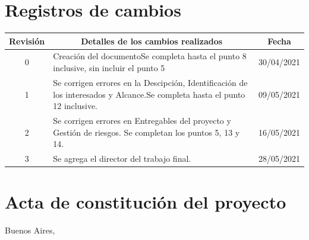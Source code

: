 \documentclass[
11pt, %
]{charter}
\begin{document}
\maketitle
\thispagestyle{empty}
\pagebreak


\thispagestyle{empty}
{\setlength{\parskip}{0pt}
\tableofcontents{}
}
\pagebreak


\section{Registros de cambios}
\label{sec:registro}


\begin{table}[ht]
\label{tab:registro}
\centering
\begin{tabularx}{\linewidth}{@{}|c|X|c|@{}}
\hline
\rowcolor[HTML]{C0C0C0} 
Revisión & \multicolumn{1}{c|}{\cellcolor[HTML]{C0C0C0}Detalles de los cambios realizados} & Fecha      \\ \hline
0      & Creación del documento\newline Se completa hasta el punto 8 inclusive, sin incluir el punto 5 &30/04/2021 \\ \hline
1      & Se corrigen errores en la Descipción, Identificación de los interesados y Alcance.\newline Se completa hasta el punto 12 inclusive.                  & 09/05/2021 \\ \hline
2      & Se corrigen errores en Entregables del proyecto y Gestión de riesgos. \newline
Se completan los puntos 5, 13 y 14.					& 16/05/2021 \\ \hline
3      & Se agrega el director del trabajo final.                & 28/05/2021 \\ \hline
\end{tabularx}
\end{table}

\pagebreak



\section{Acta de constitución del proyecto}
\label{sec:acta}

\begin{flushright}
Buenos Aires, \fechaInicioName
\end{flushright}
\end{document}
